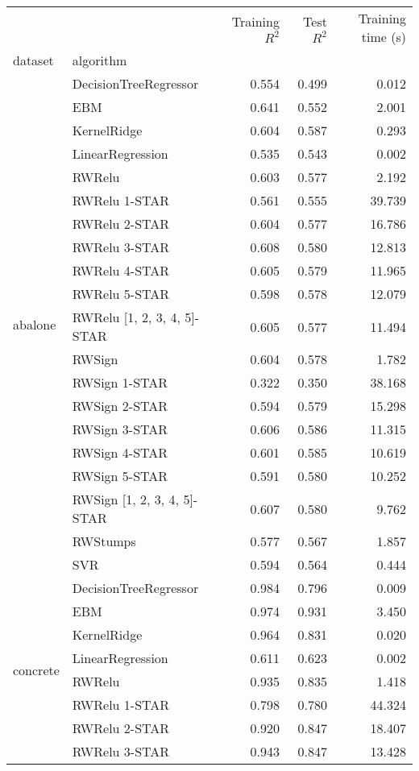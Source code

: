 \begin{tabular}{llrrr}
\toprule
 &  & Training $R^2$ & Test $R^2$ & Training time (s) \\
dataset & algorithm &  &  &  \\
\midrule
\multirow[t]{20}{*}{abalone} & DecisionTreeRegressor & 0.554 & 0.499 & 0.012 \\
 & EBM & 0.641 & 0.552 & 2.001 \\
 & KernelRidge & 0.604 & 0.587 & 0.293 \\
 & LinearRegression & 0.535 & 0.543 & 0.002 \\
 & RWRelu & 0.603 & 0.577 & 2.192 \\
 & RWRelu 1-STAR & 0.561 & 0.555 & 39.739 \\
 & RWRelu 2-STAR & 0.604 & 0.577 & 16.786 \\
 & RWRelu 3-STAR & 0.608 & 0.580 & 12.813 \\
 & RWRelu 4-STAR & 0.605 & 0.579 & 11.965 \\
 & RWRelu 5-STAR & 0.598 & 0.578 & 12.079 \\
 & RWRelu [1, 2, 3, 4, 5]-STAR & 0.605 & 0.577 & 11.494 \\
 & RWSign & 0.604 & 0.578 & 1.782 \\
 & RWSign 1-STAR & 0.322 & 0.350 & 38.168 \\
 & RWSign 2-STAR & 0.594 & 0.579 & 15.298 \\
 & RWSign 3-STAR & 0.606 & 0.586 & 11.315 \\
 & RWSign 4-STAR & 0.601 & 0.585 & 10.619 \\
 & RWSign 5-STAR & 0.591 & 0.580 & 10.252 \\
 & RWSign [1, 2, 3, 4, 5]-STAR & 0.607 & 0.580 & 9.762 \\
 & RWStumps & 0.577 & 0.567 & 1.857 \\
 & SVR & 0.594 & 0.564 & 0.444 \\
\cline{1-5}
\multirow[t]{20}{*}{concrete} & DecisionTreeRegressor & 0.984 & 0.796 & 0.009 \\
 & EBM & 0.974 & 0.931 & 3.450 \\
 & KernelRidge & 0.964 & 0.831 & 0.020 \\
 & LinearRegression & 0.611 & 0.623 & 0.002 \\
 & RWRelu & 0.935 & 0.835 & 1.418 \\
 & RWRelu 1-STAR & 0.798 & 0.780 & 44.324 \\
 & RWRelu 2-STAR & 0.920 & 0.847 & 18.407 \\
 & RWRelu 3-STAR & 0.943 & 0.847 & 13.428 \\

\end{tabular}
